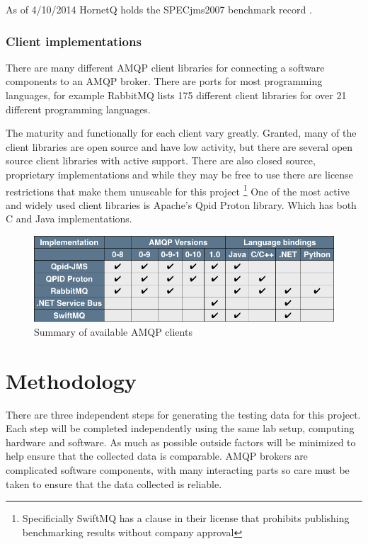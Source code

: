 \documentclass{thesis}
\begin{document}
As of 4/10/2014 HornetQ holds the SPECjms2007 benchmark record .  



\subsection{Client implementations}
There are many different AMQP client libraries for connecting a software components to an AMQP broker.  There are ports for most programming languages, for example RabbitMQ lists 175 different client libraries for over 21 different programming languages. %

The maturity and functionally for each client vary greatly.  Granted, many of the client libraries are open source and have low activity, but there are several open source client libraries with active support.  There are also closed source, proprietary implementations and while they may be free to use there are license restrictions that make them unuseable for this project \footnote{Specificially SwiftMQ has a clause in their license that prohibits publishing benchmarking results without company approval} One of the most active and widely used client libraries is Apache's Qpid Proton library.  %
Which has both C and Java implementations.  

\begin{figure}
\centering
\vspace{2.0in} 
\includegraphics[scale=.5]{client_comparision}  
\caption{Summary of available AMQP clients}
\label{Figure 1}  
\end{figure}

\chapter{Methodology}
There are three independent steps for generating the testing data for this project.  Each step will be completed independently using the same lab setup, computing hardware and software.  As much as possible outside factors will be minimized to help ensure that the collected data is comparable.  AMQP brokers are complicated software components, with many interacting parts so care must be taken to ensure that the data collected is reliable.  
\end{document}
